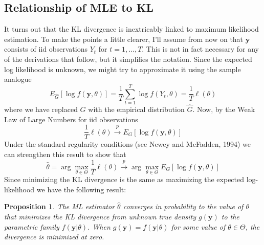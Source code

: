 \documentclass[12pt]{article}
\newtheorem{pro}{Proposition}[section]
\theoremstyle{definition}
\begin{document}
\subsection{Relationship of MLE to KL}
It turns out that the KL divergence is inextricably linked to maximum likelihood estimation. To make the points a little clearer, I'll assume from now on that $\mathbf{y}$ consists of iid observations $Y_t$ for $t = 1, \hdots, T$. This is not in fact necessary for any of the derivations that follow, but it simplifies the notation. Since the expected log likelihood is unknown, we might try to approximate it using the sample analogue
$$E_{\widehat{G}}\left[\log{f(\textbf{y},\theta)} \right] = \frac{1}{T}\sum_{t=1}^T \log{f(Y_t, \theta)} = \frac{1}{T}\ell(\theta)$$
where we have replaced $G$ with the empirical distribution $\widehat{G}$. Now, by the Weak Law of Large Numbers for iid observations
$$\frac{1}{T} \ell(\theta) \overset{p}{\rightarrow} E_G\left[ \log{f(\textbf{y},\theta)} \right]$$
Under the standard regularity conditions (see Newey and McFadden, 1994) we can strengthen this result to show that
$$\hat{\theta} = \arg \max_{\theta \in \Theta} \frac{1}{T}\ell(\theta) \overset{p}{\rightarrow} \arg \max_{\theta \in \Theta} E_G\left[ \log{f(\textbf{y},\theta)}\right]$$
Since minimizing the KL divergence is the same as maximizing the expected log-likelihood we have the following result:
\begin{pro}
The ML estimator $\hat{\theta}$ converges in probability to the value of $\theta$ that minimizes the KL divergence from unknown true density $g(\mathbf{y})$ to the parametric family $f(\mathbf{y}|\theta)$. When $g(\mathbf{y})=f(\mathbf{y}|\theta)$ for some value of $\theta \in \Theta$, the divergence is minimized at zero.
\end{pro}
\end{document}
